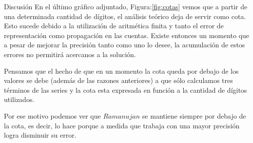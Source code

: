 \begin{section}{Discusión}
	En el último gráfico adjuntado, Figura:\ref{fig:cotas} vemos que a partir de una determinada cantidad de dígitos, el análisis teórico deja de servir como cota. Esto sucede debido a la utilización de aritmética finita y tanto el error de representación como propagación en las cuentas. Existe entonces un momento que a pesar de mejorar la precisión tanto como uno lo desee, la acumulación de estos errores no permitirá acercanos a la solución.
	
	Pensamos que el hecho de que en un momento la cota queda por debajo de los valores se debe (además de las razones anteriores) a que sólo calculamos tres términos de las series y la cota esta expresada en función a la cantidad de dígitos utilizados.
	
	Por ese motivo podemos ver que $Ramanujan$ se mantiene siempre por debajo de la cota, es decir, lo hace porque a medida que trabaja con una mayor precisión logra disminuir su error.
\end{section}
